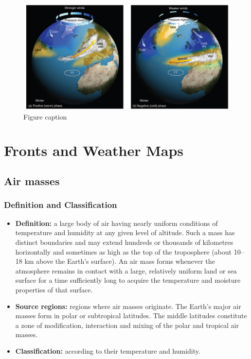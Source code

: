 \documentclass[12pt,oneside]{book}
\providecommand{\tightlist}{%
  \setlength{\itemsep}{0pt}\setlength{\parskip}{0pt}}
\begin{document}
\begin{figure}

{\centering \includegraphics[width=0.8\linewidth]{figures/Figure536} 

}

\caption{Figure caption}\label{fig:Fig536}
\end{figure}

\chapter{Fronts and Weather Maps}\label{WFM}


\section{Air masses}\label{air-masses}

\subsection{Definition and
Classification}\label{definition-and-classification}

\begin{itemize}
\tightlist
\item
  \textbf{Definition:} a large body of air having nearly uniform
  conditions of temperature and humidity at any given level of altitude.
  Such a mass has distinct boundaries and may extend hundreds or
  thousands of kilometres horizontally and sometimes as high as the top
  of the troposphere (about 10--18 km above the Earth's surface). An air
  mass forms whenever the atmosphere remains in contact with a large,
  relatively uniform land or sea surface for a time sufficiently long to
  acquire the temperature and moisture properties of that surface.
\item
  \textbf{Source regions:} regions where air masses originate. The
  Earth's major air masses form in polar or subtropical latitudes. The
  middle latitudes constitute a zone of modification, interaction and
  mixing of the polar and tropical air masses.
\item
  \textbf{Classification:} according to their temperature and humidity.
\end{itemize}
\end{document}
